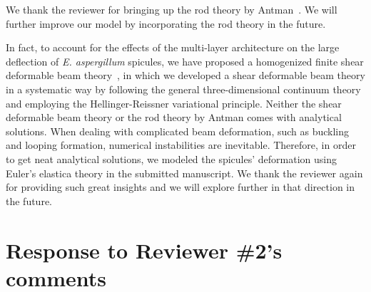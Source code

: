 \documentclass[11pt,letterpaper]{report}
\begin{document}
\begin{enumerate}[label=\textit{1.\arabic*},wide, labelwidth=!, labelindent=0pt]


We thank the reviewer for bringing up the rod theory by Antman~\cite{antman2005problems}. We will further improve our model by incorporating the rod theory in the future.

In fact, to account for the effects of the multi-layer architecture on the large deflection of \textit{E. aspergillum} spicules, we have proposed a homogenized finite shear deformable beam theory~\cite{FangShearBeam}, in which we developed a shear deformable beam theory in a systematic way by following the general three-dimensional continuum theory and employing the Hellinger-Reissner variational principle. Neither the shear deformable beam theory or the rod theory by Antman comes with analytical solutions. When dealing with complicated beam deformation, such as buckling and looping formation, numerical instabilities are inevitable. Therefore, in order to get neat analytical solutions, we modeled the spicules' deformation using Euler's elastica theory in the submitted manuscript. We thank the reviewer again for providing such great insights and we will explore further in that direction in the future.





\clearpage

\section*{Response to Reviewer \#2's comments}
\label{rev2}


\end{enumerate}
\end{document}
